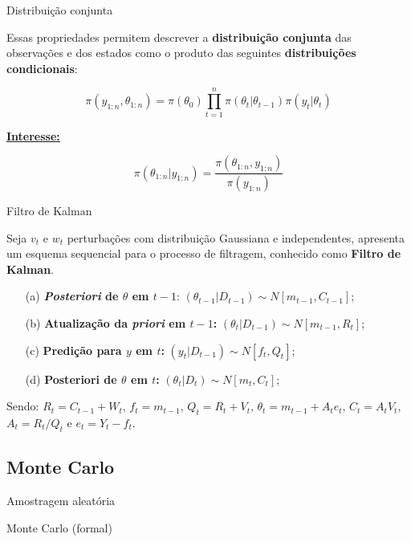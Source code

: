 \documentclass{beamer}
\begin{document}
\begin{frame}{Distribuição conjunta}

Essas propriedades permitem descrever a \textbf{distribuição conjunta} das observações e dos estados como o produto das seguintes \textbf{distribuições condicionais}:

$$
\pi(y_{1:n},\theta_{1:n}) = \pi(\theta_0) \prod_{t=1}^n \pi(\theta_t|\theta_{t-1})\pi(y_t|\theta_t) 
$$

\underline{\textbf{Interesse:}}

$$\pi(\theta_{1:n}|y_{1:n}) =  \frac{\pi(\theta_{1:n},y_{1:n})}{\pi(y_{1:n})} $$


\end{frame}


\begin{frame}{Filtro de Kalman}

Seja $v_t$ e $w_t$ perturbações com distribuição Gaussiana e independentes, \cite{west} apresenta um esquema sequencial para o processo de filtragem, conhecido como \textbf{Filtro de Kalman}.

\begin{itemize}
\item[(a)]\textbf{\textit{Posteriori} de $\theta$ em $t-1$}:  $(\theta_{t-1}|D_{t-1})\sim N[m_{t-1},C_{t-1}]$;
\item[(b)]\textbf{Atualização da \textit{priori} em $t-1$:} $(\theta_{t}|D_{t-1})\sim N[m_{t-1},R_{t}]$;
\item[(c)]\textbf{Predição para $y$ em $t$:}  $(y_t|D_{t-1})\sim N[f_{t},Q_{t}]$;
\item[(d)]\textbf{Posteriori de $\theta$ em $t$:}  $(\theta_t|D_{t})\sim N[m_{t},C_{t}]$;
\end{itemize}
Sendo: $R_t = C_{t-1}+W_t$, $f_t = m_{t-1}$, $Q_t = R_{t}+V_t$, $\theta_t = m_{t-1}+A_te_t$,  $C_t=A_tV_t$, $A_t=R_t/Q_t$ e $e_t=Y_t-f_t$.

\end{frame}


\subsection{Monte Carlo}

\begin{frame}{Amostragem aleatória}

    \begin{block}{}
      \Huge  Monte Carlo (formal)
    \end{block}


\end{frame}
\end{document}
